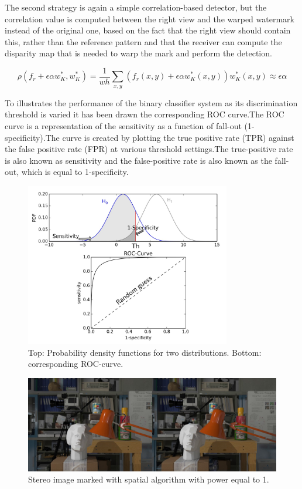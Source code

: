 The second strategy is again a simple correlation-based detector, but the correlation value is computed between the right view and the warped watermark instead of the original one, based on the fact that the right view should contain this, rather than the reference pattern and that the receiver can compute the disparity map that is needed to warp the mark and perform the detection.

$$\rho(f_{r}+\epsilon\alpha w_{K}^{*},w_{K}^{*})= \frac{1}{wh}\sum_{x,y}(f_{r}(x,y)+\epsilon\alpha w_{K}^{*}(x,y))w_{K}^{*}(x,y)\approx\epsilon\alpha $$

To illustrates the performance of the binary classifier system as its discrimination threshold is varied it has been drawn the corresponding ROC curve.\newline  The ROC curve is a representation of the sensitivity as a function of fall-out (1-specificity).\newline  The curve is created by plotting the true positive rate (TPR) against the false positive rate (FPR) at various threshold settings.\newline The true-positive rate is also known as sensitivity and the false-positive rate is also known as the fall-out, which is equal to 1-specificity.\newline  

\begin{figure}[h!]
\centering
\includegraphics[width=0.8\textwidth]{./img/roc.jpg}
\caption{\small{Top: Probability density functions for two distributions. Bottom: corresponding ROC-curve.}}
\label{fig:roc}
\end{figure}

\begin{figure}[h!]
\centering
\includegraphics[width=1\textwidth]{./img/marked_1_gauss.jpg}
\caption{\small{Stereo image marked with spatial algorithm with power equal to 1.}}
\label{fig:gauss1}
\end{figure}

